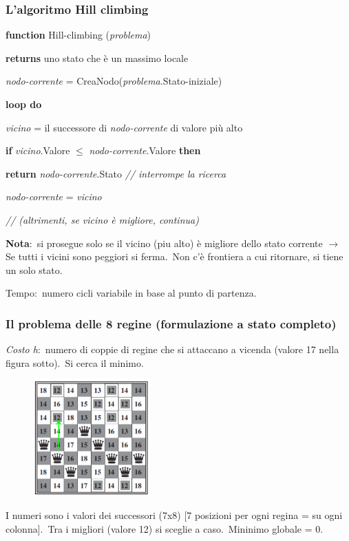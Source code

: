\subsubsection{L'algoritmo Hill climbing}
\begin{flushleft}
	\textbf{function} Hill-climbing (\textit{problema})

	\quad \textbf{returns} uno stato che è un massimo locale

	\qquad \textit{nodo-corrente} = CreaNodo(\textit{problema}.Stato-iniziale)

	\qquad \textbf{loop do}

	\qquad \quad \textit{vicino} = il successore di \textit{nodo-corrente} di valore più alto

	\qquad \quad \textbf{if} \textit{vicino}.Valore $\leq$ \textit{nodo-corrente}.Valore \textbf{then}

	\qquad \qquad \textbf{return} \textit{nodo-corrente}.Stato \textit{// interrompe la ricerca}

	\qquad \quad \textit{nodo-corrente} = \textit{vicino}

	\qquad \quad \textit{// (altrimenti, se vicino è migliore, continua)}
\end{flushleft}
\textbf{Nota}:\ si prosegue solo se il vicino (piu alto) è migliore dello stato corrente $\rightarrow$ Se tutti i vicini sono peggiori si ferma.\ Non c'è frontiera a cui ritornare, si tiene un solo stato.\

Tempo:\ numero cicli variabile in base al punto di partenza.

\subsubsection{Il problema delle 8 regine (formulazione a stato completo)}

\textit{Costo h}:\ numero di coppie di regine che si attaccano a vicenda (valore 17 nella figura sotto).\
Si cerca il minimo.
\begin{figure}[H]
	\centering
	\includegraphics[width=0.4\textwidth]{immagini/otto_regine_hillClimbing.png}
\end{figure}
\noindent
I numeri sono i valori dei successori (7x8) [7 posizioni per ogni regina = su ogni colonna].\
Tra i migliori (valore 12) si sceglie a caso.\
Mininimo globale = 0.

